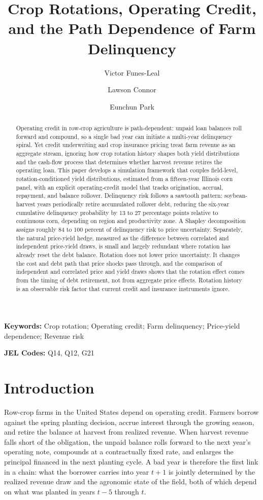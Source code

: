 \documentclass[11pt,letterpaper]{article}
\title{Crop Rotations, Operating Credit, and the Path Dependence of Farm Delinquency}
\author{Victor Funes-Leal}
\author{Lawson Connor}
\author{Eunchun Park}
\affil{Department of Agricultural Economics and Agribusiness, University of Arkansas}
\date{}
\theoremstyle{remark}
\begin{document}
 
\maketitle
 
\begin{abstract}
Operating credit in row-crop agriculture is path-dependent: unpaid loan balances roll forward and compound, so a single bad year can initiate a multi-year delinquency spiral. Yet credit underwriting and crop insurance pricing treat farm revenue as an aggregate stream, ignoring how crop rotation history shapes both yield distributions and the cash-flow process that determines whether harvest revenue retires the operating loan. This paper develops a simulation framework that couples field-level, rotation-conditioned yield distributions, estimated from a fifteen-year Illinois corn panel, with an explicit operating-credit model that tracks origination, accrual, repayment, and balance rollover. Delinquency risk follows a sawtooth pattern: soybean-harvest years periodically retire accumulated rollover debt, reducing the six-year cumulative delinquency probability by 13 to 27 percentage points relative to continuous corn, depending on region and productivity zone. A Shapley decomposition assigns roughly 84 to 100 percent of delinquency risk to price uncertainty. Separately, the natural price-yield hedge, measured as the difference between correlated and independent price-yield draws, is small and largely redundant where rotation has already reset the debt balance. Rotation does not lower price uncertainty. It changes the cost and debt path that price shocks pass through, and the comparison of independent and correlated price and yield draws shows that the rotation effect comes from the timing of debt retirement, not from aggregate price effects. Rotation history is an observable risk factor that current credit and insurance instruments ignore.
\end{abstract}
 
\noindent\textbf{Keywords:} Crop rotation; Operating credit; Farm delinquency; Price-yield dependence; Revenue risk
 
\noindent\textbf{JEL Codes:} Q14, Q12, G21
 
\clearpage
 
\section{\label{sec:introduction}Introduction}
 
Row-crop farms in the United States depend on operating credit. Farmers borrow against the spring planting decision, accrue interest through the growing season, and retire the balance at harvest from realized revenue. When harvest revenue falls short of the obligation, the unpaid balance rolls forward to the next year's operating note, compounds at a contractually fixed rate, and enlarges the principal financed in the next planting cycle. A bad year is therefore the first link in a chain: what the borrower carries into year $t+1$ is jointly determined by the realized revenue draw and the agronomic state of the field, both of which depend on what was planted in years $t-5$ through $t$.
 
\end{document}
